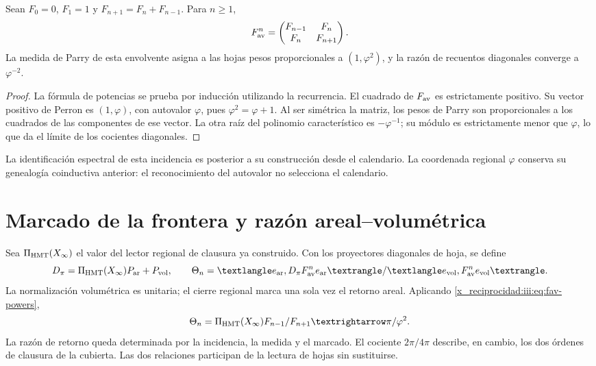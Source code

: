 \begin{proposition}
Sean $F_0=0$, $F_1=1$ y $F_{n+1}=F_n+F_{n-1}$. Para $n\geq1$,
\begin{equation}
 F_{\rm av}^{n}=
 \begin{pmatrix}F_{n-1}&F_n\\F_n&F_{n+1}\end{pmatrix}.
 \label{x_reciprocidad:iii:eq:fav-powers}
\end{equation}
La medida de Parry de esta envolvente asigna a las hojas pesos proporcionales
a $(1,\varphi^2)$, y la razón de recuentos diagonales converge a $\varphi^{-2}$.
\end{proposition}
\begin{proof}
La fórmula de potencias se prueba por inducción utilizando la recurrencia.
El cuadrado de $F_{\rm av}$ es estrictamente positivo. Su vector positivo de
Perron es $(1,\varphi)$, con autovalor $\varphi$, pues
$\varphi^2=\varphi+1$. Al ser simétrica la matriz, los pesos de Parry son
proporcionales a los cuadrados de las componentes de ese vector. La otra raíz
del polinomio característico es $-\varphi^{-1}$; su módulo es estrictamente
menor que $\varphi$, lo que da el límite de los cocientes diagonales.
\end{proof}

La identificación espectral de esta incidencia es posterior a su construcción
desde el calendario. La coordenada regional $\varphi$ conserva su genealogía
coinductiva anterior: el reconocimiento del autovalor no selecciona el calendario.

\section{Marcado de la frontera y razón areal--volumétrica}

Sea $\Pi_{\rm HMT}(X_\infty)$ el valor del lector regional de clausura ya
construido. Con los proyectores diagonales de hoja, se define
\begin{equation}
 D_\pi=\Pi_{\rm HMT}(X_\infty)P_{\rm ar}+P_{\rm vol},\qquad
 \Theta_n=
 \frac{\langle e_{\rm ar},D_\pi F_{\rm av}^{n}e_{\rm ar}\rangle}
 {\langle e_{\rm vol},F_{\rm av}^{n}e_{\rm vol}\rangle}.
 \label{x_reciprocidad:iii:eq:marked-return}
\end{equation}
La normalización volumétrica es unitaria; el cierre regional marca una sola vez
el retorno areal. Aplicando \eqref{x_reciprocidad:iii:eq:fav-powers},
\begin{equation}
 \Theta_n=\Pi_{\rm HMT}(X_\infty)\frac{F_{n-1}}{F_{n+1}}
 \longrightarrow\frac{\pi}{\varphi^2}.
 \label{x_reciprocidad:iii:eq:av-limit}
\end{equation}
La razón de retorno queda determinada por la incidencia, la medida y el marcado.
El cociente $2\pi/4\pi$ describe, en cambio, los dos órdenes de clausura de la
cubierta. Las dos relaciones participan de la lectura de hojas sin sustituirse.

